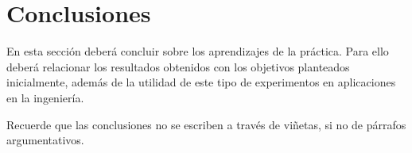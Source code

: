 \section{Conclusiones}

En esta sección deberá concluir sobre los aprendizajes de la práctica. Para ello deberá
relacionar los resultados obtenidos con los objetivos planteados inicialmente, además
de la utilidad de este tipo de experimentos en aplicaciones en la ingeniería.

Recuerde que las conclusiones no se escriben a través de viñetas, si no de párrafos
argumentativos.
